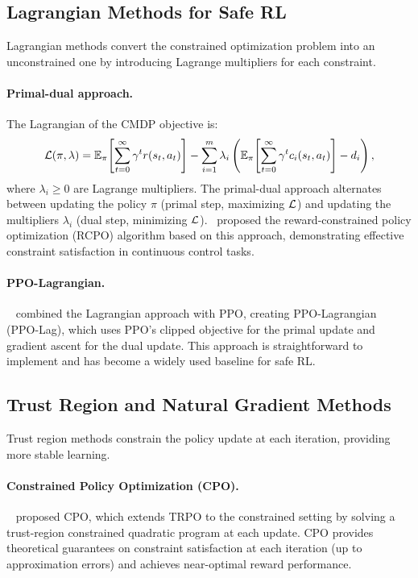 \subsection{Lagrangian Methods for Safe RL}

Lagrangian methods convert the constrained optimization problem into an unconstrained one by introducing Lagrange multipliers for each constraint.

\paragraph{Primal-dual approach.} The Lagrangian of the CMDP objective is:
\begin{equation}
    \mathcal{L}(\pi, \lambda) = \mathbb{E}_{\pi}\!\left[\sum_{t=0}^{\infty} \gamma^t r(s_t, a_t)\right] - \sum_{i=1}^{m} \lambda_i \left(\mathbb{E}_{\pi}\!\left[\sum_{t=0}^{\infty} \gamma^t c_i(s_t, a_t)\right] - d_i\right),
\end{equation}
where $\lambda_i \geq 0$ are Lagrange multipliers. The primal-dual approach alternates between updating the policy $\pi$ (primal step, maximizing $\mathcal{L}$) and updating the multipliers $\lambda_i$ (dual step, minimizing $\mathcal{L}$).~\citet{tessler2019rcpo} proposed the reward-constrained policy optimization (RCPO) algorithm based on this approach, demonstrating effective constraint satisfaction in continuous control tasks.

\paragraph{PPO-Lagrangian.}~\citet{ray2019benchmarking_safe} combined the Lagrangian approach with PPO, creating PPO-Lagrangian (PPO-Lag), which uses PPO's clipped objective for the primal update and gradient ascent for the dual update. This approach is straightforward to implement and has become a widely used baseline for safe RL.

\subsection{Trust Region and Natural Gradient Methods}

Trust region methods constrain the policy update at each iteration, providing more stable learning.

\paragraph{Constrained Policy Optimization (CPO).}~\citet{achiam2017cpo} proposed CPO, which extends TRPO to the constrained setting by solving a trust-region constrained quadratic program at each update. CPO provides theoretical guarantees on constraint satisfaction at each iteration (up to approximation errors) and achieves near-optimal reward performance.

